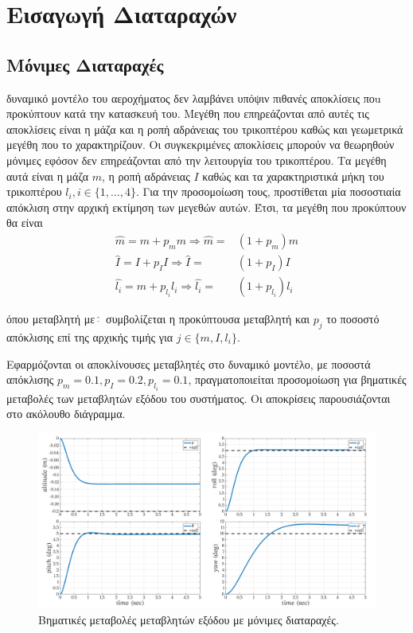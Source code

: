 \section{Εισαγωγή Διαταραχών}
\subsection{Μόνιμες Διαταραχές}
 δυναμικό μοντέλο του αεροχήματος δεν λαμβάνει υπόψιν πιθανές 
αποκλίσεις ποu προκύπτουν κατά την κατασκευή του. Μεγέθη που επηρεάζονται από 
αυτές τις αποκλίσεις είναι η μάζα και η ροπή αδράνειας του τρικοπτέρου καθώς και 
γεωμετρικά μεγέθη που το χαρακτηρίζουν. Οι συγκεκριμένες αποκλίσεις μπορούν να 
θεωρηθούν μόνιμες εφόσον δεν επηρεάζονται από την λειτουργία του τρικοπτέρου. Τα
μεγέθη αυτά είναι η μάζα $m$, η ροπή αδράνειας $I$ καθώς και τα χαρακτηριστικά
μήκη του τρικοπτέρου $l_i, i\in \{1,\ldots,4\}$. Για την προσομοίωση τους,  
προστίθεται μία ποσοστιαία απόκλιση στην αρχική εκτίμηση των μεγεθών αυτών.
Έτσι, τα μεγέθη που προκύπτουν θα είναι
\begin{align*}
    \widehat{m} = m + p_mm  \Rightarrow \widehat{m} =& (1+p_m)m\\
    \widehat{I} = I + p_II \Rightarrow \widehat{I} =&(1+p_I)I\\
    \widehat{l_i} = m + p_{l_i}l_i  \Rightarrow \widehat{l_i} =& 
    (1+p_{l_i})l_i
\end{align*}

όπου μεταβλητή με $\,\widehat{\dot{}}\,$ συμβολίζεται η προκύπτουσα μεταβλητή 
και $p_j$ το ποσοστό απόκλισης επί της αρχικής τιμής για $j \in\{m,I,l_i\}$.

Εφαρμόζονται οι αποκλίνουσες μεταβλητές στο δυναμικό μοντέλο, με ποσοστά 
απόκλισης $p_m = 0.1, p_I = 0.2, p_{l_{i}} = 0.1$, πραγματοποιείται προσομοίωση
για βηματικές μεταβολές των μεταβλητών εξόδου του συστήματος. Οι αποκρίσεις 
παρουσιάζονται στο ακόλουθο διάγραμμα.

\begin{figure}[H]
    \centering
    \includegraphics[width=1\textwidth]{Control/Nominal/fig_testeig_p.png}
    \caption{Βηματικές μεταβολές μεταβλητών εξόδου με μόνιμες διαταραχές.}
    \label{fig:testig}
\end{figure}

